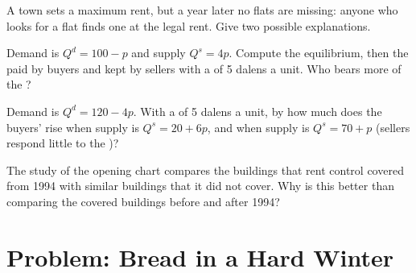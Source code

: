 \begin{exercise}[$\star\star$]\label{exo:g9:price-controls-taxes-subsidies:9}
A town sets a maximum rent, but a year later no flats are missing: anyone who looks for a flat finds one
at the legal rent. Give two possible explanations.
\end{exercise}

\begin{exercise}[$\star\star\star$]\label{exo:g9:price-controls-taxes-subsidies:10}
Demand is $Q^d = 100 - p$ and supply $Q^s = 4p$. Compute the equilibrium, then the  paid by buyers
and kept by sellers with a  of 5 dalens a unit. Who bears more of the ?
\end{exercise}

\begin{exercise}[$\star\star\star$]\label{exo:g9:price-controls-taxes-subsidies:11}
Demand is $Q^d = 120 - 4p$. With a  of 5 dalens a unit, by how much does the buyers'  rise when
supply is $Q^s = 20 + 6p$, and when supply is $Q^s = 70 + p$ (sellers respond little to the )?
\end{exercise}

\begin{exercise}[$\star\star\star$]\label{exo:g9:price-controls-taxes-subsidies:12}
The study of the opening chart compares the buildings that rent control covered from 1994 with similar
buildings that it did not cover. Why is this better than comparing the covered buildings before and after
1994?
\end{exercise}

\section{Problem: Bread in a Hard Winter}

